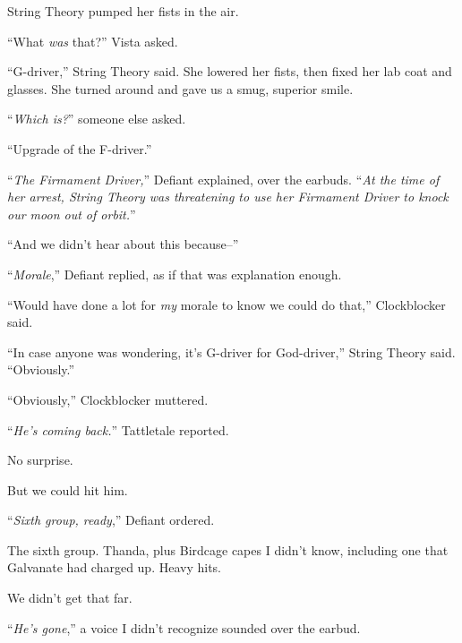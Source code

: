 String Theory pumped her fists in the air.



``What \emph{was} that?'' Vista asked.



``G-driver,'' String Theory said.  She lowered her fists, then fixed her lab coat and glasses.  She turned around and gave us a smug, superior smile.



``\emph{Which is?}'' someone else asked.



``Upgrade of the F-driver.''



``\emph{The Firmament Driver,}'' Defiant explained, over the earbuds.  ``\emph{At the time of her arrest, String Theory was threatening to use her Firmament Driver to knock our moon out of orbit.}''



``And we didn't hear about this because--''



``\emph{Morale},'' Defiant replied, as if that was explanation enough.



``Would have done a lot for \emph{my} morale to know we could do that,'' Clockblocker said.



``In case anyone was wondering, it's G-driver for God-driver,'' String Theory said.  ``Obviously.''



``Obviously,'' Clockblocker muttered.



``\emph{He's coming back.}'' Tattletale reported.



No surprise.



But we could hit him.



``\emph{Sixth group, ready},'' Defiant ordered.



The sixth group.  Thanda, plus Birdcage capes I didn't know, including one that Galvanate had charged up.  Heavy hits.



We didn't get that far.



``\emph{He's gone},'' a voice I didn't recognize sounded over the earbud.



